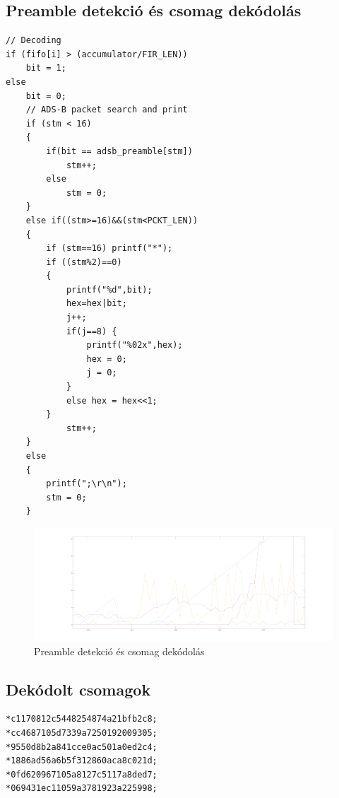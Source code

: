\newpage
\subsection{Preamble detekció és csomag dekódolás}
\begin{lstlisting}
// Decoding
if (fifo[i] > (accumulator/FIR_LEN))
    bit = 1;
else
	bit = 0;
	// ADS-B packet search and print
	if (stm < 16)
	{
		if(bit == adsb_preamble[stm])
			stm++;
        else
			stm = 0;
    }
	else if((stm>=16)&&(stm<PCKT_LEN))
	{
		if (stm==16) printf("*");
		if ((stm%2)==0)
		{
			printf("%d",bit);
			hex=hex|bit;
			j++;
			if(j==8) {
                printf("%02x",hex);
				hex = 0;
				j = 0;
			}
			else hex = hex<<1;
		}
            stm++;
	}
	else
	{
		printf(";\r\n");
		stm = 0;
	}
\end{lstlisting}
\begin{figure}[h]
    \centering
    \includegraphics[width=1\textwidth]{../meres/result/preambledet_datacalc.png}
    \caption{Preamble detekció és csomag dekódolás}
    \label{fig:deceison}
\end{figure}

\newpage
\subsection{Dekódolt csomagok}
\begin{lstlisting}
*c1170812c5448254874a21bfb2c8;
*cc4687105d7339a7250192009305;
*9550d8b2a841cce0ac501a0ed2c4;
*1886ad56a6b5f312860aca8c021d;
*0fd620967105a8127c5117a8ded7;
*069431ec11059a3781923a225998;
\end{lstlisting}

\newpage
